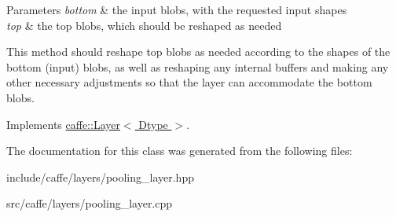 \begin{DoxyParams}{Parameters}
{\em bottom} & the input blobs, with the requested input shapes \\
\hline
{\em top} & the top blobs, which should be reshaped as needed\\
\hline
\end{DoxyParams}
This method should reshape top blobs as needed according to the shapes of the bottom (input) blobs, as well as reshaping any internal buffers and making any other necessary adjustments so that the layer can accommodate the bottom blobs. 

Implements \hyperlink{classcaffe_1_1Layer_ad9d391b972c769c0ebee34ca6d1c973e}{caffe\+::\+Layer$<$ Dtype $>$}.



The documentation for this class was generated from the following files\+:\begin{DoxyCompactItemize}
\item 
include/caffe/layers/pooling\+\_\+layer.\+hpp\item 
src/caffe/layers/pooling\+\_\+layer.\+cpp\end{DoxyCompactItemize}
